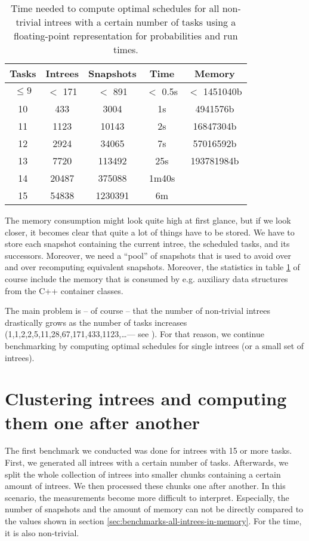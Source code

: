 \begin{table}[ht]
  \centering
  \begin{tabular}[ht]{ccccc}
    Tasks & Intrees & Snapshots & Time & Memory \\
    \hline{}
    $\leq 9$ & $<$ 171 & $<$ 891 & $<$ 0.5s & $<$ 1451040b \\
    10 & 433 & 3004 & 1s & 4941576b \\
    11 & 1123 & 10143 & 2s & 16847304b \\
    12 & 2924 & 34065 & 7s & 57016592b \\
    13 & 7720 & 113492 & 25s & 193781984b \\
    14 & 20487 & 375088 & 1m40s & \\
    15 & 54838 & 1230391 & 6m & \\
    
  \end{tabular}
  \caption{Time needed to compute optimal schedules for all non-trivial intrees with a certain number of tasks using a floating-point representation for probabilities and run times.}
  \label{tab:time-benchmark}
\end{table}

The memory consumption might look quite high at first glance, but if we look closer, it becomes clear that quite a lot of things have to be stored. We have to store each snapshot containing the current intree, the scheduled tasks, and its successors. Moreover, we need a ``pool'' of snapshots that is used to avoid over and over recomputing equivalent snapshots. Moreover, the statistics in table \ref{tab:time-benchmark} of course include the memory that is consumed by e.g. auxiliary data structures from the C++ container classes.

The main problem is -- of course -- that the number of non-trivial intrees drastically grows as the number of tasks increases (1,1,2,2,5,11,28,67,171,433,1123,\dots --- see \cite{oeisnumbernontrivialintrees}). For that reason, we continue benchmarking by computing optimal schedules for single intrees (or a small set of intrees).

\section{Clustering intrees and computing them one after another}
\label{sec:benchmarks-clustered-intrees}

The first benchmark we conducted was done for intrees with 15 or more tasks. First, we generated all intrees with a certain number of tasks. Afterwards, we split the whole collection of intrees into smaller chunks containing a certain amount of intrees. We then processed these chunks one after another. In this scenario, the measurements become more difficult to interpret. Especially, the number of snapshots and the amount of memory can not be directly compared to the values shown in section \ref{sec:benchmarks-all-intrees-in-memory}. For the time, it is also non-trivial.

